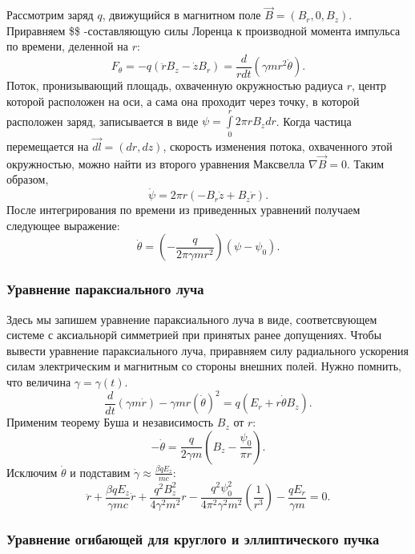 \documentclass[11pt]{article}
\begin{document}
    Рассмотрим заряд \(q\), движущийся в магнитном поле
\(\vec B = (B_r,0,B_z)\). Приравняем \$\theta \$ -составляющую силы
Лоренца к производной момента импульса по времени, деленной на \(r\): \[
F_\theta = -q(\ddot r B_z - \dot z B_r) = \frac{d}{rdt}(\gamma m r^2 \dot \theta).
\] Поток, пронизывающий площадь, охваченную окружностью радиуса \(r\),
центр которой расположен на оси, а сама она проходит через точку, в
которой расположен заряд, записывается в виде
\(\psi = \int\limits^r_0 2\pi r B_z dr\). Когда частица перемещается на
\(\vec{dl} = (dr,dz)\), скорость изменения потока, охваченного этой
окружностью, можно найти из второго уравнения Максвелла
\(\nabla \vec{B} = 0.\) Таким образом, \[
\dot\psi = 2\pi r (-B_r \dot z + B_z \dot r).
\] После интегрирования по времени из приведенных уравнений получаем
следующее выражение: \[
\dot \theta = (-\frac{q}{2\pi \gamma m r^2})(\psi - \psi_0).
\]

    \hypertarget{ux443ux440ux430ux432ux43dux435ux43dux438ux435-ux43fux430ux440ux430ux43aux441ux438ux430ux43bux44cux43dux43eux433ux43e-ux43bux443ux447ux430}{%
\subsubsection{Уравнение параксиального
луча}\label{ux443ux440ux430ux432ux43dux435ux43dux438ux435-ux43fux430ux440ux430ux43aux441ux438ux430ux43bux44cux43dux43eux433ux43e-ux43bux443ux447ux430}}

    Здесь мы запишем уравнение параксиального луча в виде, соответсвующем
системе с аксиальнорй симметрией при принятых ранее допущениях. Чтобы
вывести уравнение параксиального луча, приравняем силу радиального
ускорения силам электрическим и магнитным со стороны внешних полей.
Нужно помнить, что величина \(\gamma = \gamma(t).\) \[
\frac{d}{dt}(\gamma m \dot r) - \gamma m r (\dot \theta)^2 = q(E_r + r\dot \theta B_z).
\] Применим теорему Буша и независимость \(B_z\) от \(r:\) \[
 -\dot \theta = \frac{q}{2\gamma m}(B_z - \frac{\psi_0}{\pi r}).
\] Исключим \(\dot \theta\) и подставим
\(\displaystyle \dot \gamma \approx \frac {\beta q E_z }{mc}:\) \[
\ddot r + \frac{\beta q E_z}{\gamma m c} \dot r + \frac{q^2 B^2_z}{4\gamma ^2 m^2} r - \frac{ q^2 \psi^2_0}{4\pi^2\gamma^2 m^2} (\frac{1}{r^3}) - \frac{q E_r}{\gamma m } = 0.
\]

    \hypertarget{ux443ux440ux430ux432ux43dux435ux43dux438ux435-ux43eux433ux438ux431ux430ux44eux449ux435ux439-ux434ux43bux44f-ux43aux440ux443ux433ux43bux43eux433ux43e-ux438-ux44dux43bux43bux438ux43fux442ux438ux447ux435ux441ux43aux43eux433ux43e-ux43fux443ux447ux43aux430}{%
\subsubsection{Уравнение огибающей для круглого и эллиптического
пучка}\label{ux443ux440ux430ux432ux43dux435ux43dux438ux435-ux43eux433ux438ux431ux430ux44eux449ux435ux439-ux434ux43bux44f-ux43aux440ux443ux433ux43bux43eux433ux43e-ux438-ux44dux43bux43bux438ux43fux442ux438ux447ux435ux441ux43aux43eux433ux43e-ux43fux443ux447ux43aux430}}
\end{document}

